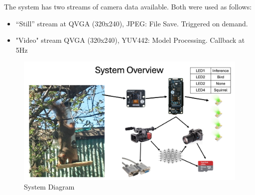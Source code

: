 \documentclass[conference]{IEEEtran}
\begin{document}
The system has two streams of camera data available. Both were used as follows:
\begin{itemize}
    \item “Still” stream at QVGA (320x240), JPEG: File Save. Triggered on demand.
    \item "Video" stream QVGA (320x240), YUV442: Model Processing. Callback at 5Hz
\end{itemize} 

\begin{figure}[htbp]
\centerline{\includegraphics[scale=.22]{blockDiagram.png}}
\caption{System Diagram}
\label{blockDiagram}
\end{figure}
\end{document}
